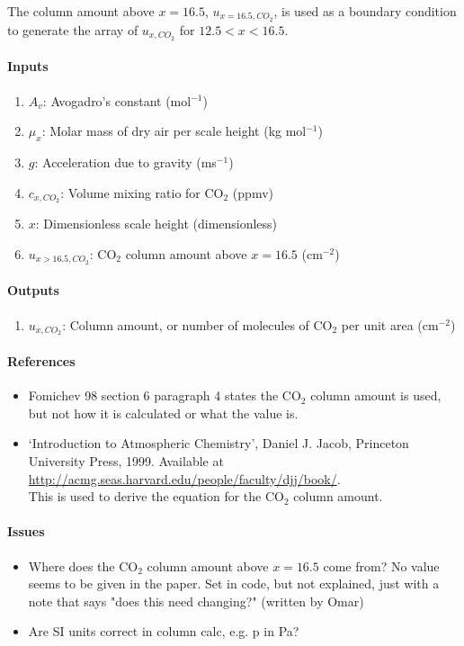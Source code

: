    The column amount above $x = 16.5$, $u_{x=16.5,CO_2}$, is used as a 
   boundary condition to generate the array of $u_{x,CO_2}$ for 
   $12.5 < x < 16.5$.

   \paragraph{Inputs}
   \begin{enumerate}
   \item $A_v$: Avogadro's constant (mol$^{-1}$)
   \item $\mu_x$: Molar mass of dry air per scale height (kg mol$^{-1}$)
   \item $g$: Acceleration due to gravity (ms$^{-1}$)
   \item $c_{x,CO_2}$: Volume mixing ratio for CO$_2$ (ppmv)
   \item $x$: Dimensionless scale height (dimensionless)
   \item $u_{x>16.5,CO_2}$: CO$_2$ column amount above $x = 16.5$ (cm$^{-2}$)
   \end{enumerate}

   \paragraph{Outputs}
   \begin{enumerate}
   \item $u_{x,CO_2}$: Column amount, or number of molecules of CO$_2$ per 
     unit area (cm$^{-2}$)
   \end{enumerate}

   \paragraph{References}
   \begin{itemize}
   \item Fomichev 98 section 6 paragraph 4 states the CO$_2$ column amount 
     is used, but not how it is calculated or what the value is.
   \item `Introduction to Atmospheric Chemistry', Daniel J. Jacob, Princeton University Press, 1999. Available at \\ 
\url{http://acmg.seas.harvard.edu/people/faculty/djj/book/}. \\
This is used to derive the equation for the CO$_2$ column amount.
   \end{itemize}

   \paragraph{Issues}
   \begin{itemize}
   \item Where does the CO$_2$ column amount above $x = 16.5$ come from? No value 
      seems to be given in the paper. Set in code, but not explained, just 
      with a note that says "does this need changing?" (written by Omar)
   \item Are SI units correct in column calc, e.g. p in Pa?
   \end{itemize}


